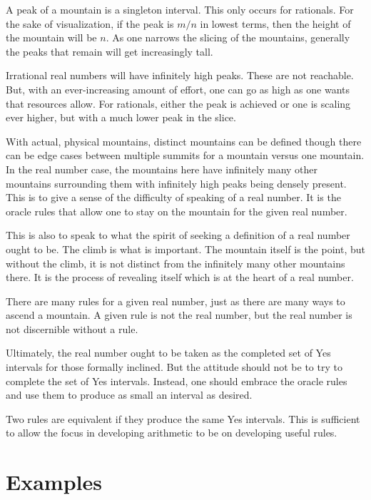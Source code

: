 \documentclass[12pt]{article}
\begin{document}
A peak of a mountain is a singleton interval. This only occurs for rationals. For the sake of visualization, if the peak is $m/n$ in lowest terms, then the height of the mountain will be $n$. As one narrows the slicing of the mountains, generally the peaks that remain will get increasingly tall. 

Irrational real numbers will have infinitely high peaks. These are not reachable. But, with an ever-increasing amount of effort, one can go as high as one wants that resources allow. For rationals, either the peak is achieved or one is scaling ever higher, but with a much lower peak in the slice. 

With actual, physical mountains, distinct mountains can be defined though there can be edge cases between multiple summits for a mountain versus one mountain. In the real number case, the mountains here have infinitely many other mountains surrounding them with infinitely high peaks being densely present. This is to give a sense of the difficulty of speaking of a real number. It is the oracle rules that allow one to stay on the mountain for the given real number. 

This is also to speak to what the spirit of seeking a definition of a real number ought to be. The climb is what is important. The mountain itself is the point, but without the climb, it is not distinct from the infinitely many other mountains there. It is the process of revealing itself which is at the heart of a real number. 

There are many rules for a given real number, just as there are many ways to ascend a mountain. A given rule is not the real number, but the real number is not discernible without a rule. 

Ultimately, the real number ought to be taken as the completed set of Yes intervals for those formally inclined. But the attitude should not be to try to complete the set of Yes intervals. Instead, one should embrace the oracle rules and use them to produce as small an interval as desired. 

Two rules are equivalent if they produce the same Yes intervals. This is sufficient to allow the focus in developing arithmetic to be on developing useful rules. 

\section{Examples}
\end{document}
